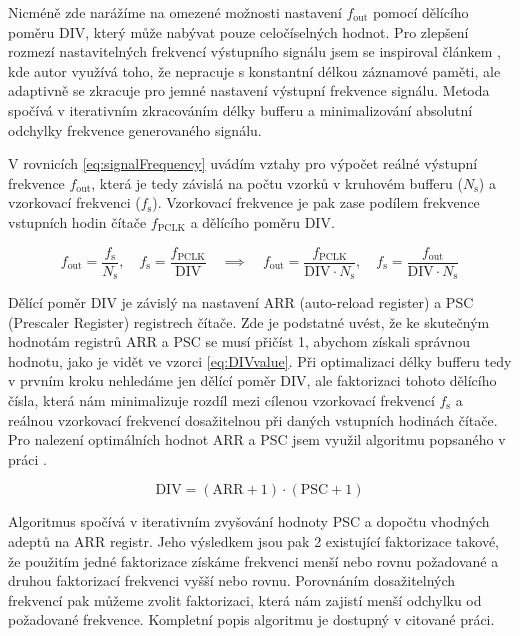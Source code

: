 Nicméně zde narážíme na omezené možnosti nastavení $f_{\text{out}}$ pomocí dělícího poměru DIV, který může nabývat pouze celočíselných hodnot. Pro zlepšení rozmezí nastavitelných frekvencí výstupního signálu jsem se inspiroval článkem \cite{SDI_Hladik}, kde autor využívá toho, že nepracuje s konstantní délkou záznamové paměti, ale adaptivně se zkracuje pro jemné nastavení výstupní frekvence signálu. Metoda spočívá v iterativním zkracováním délky bufferu a minimalizování absolutní odchylky frekvence generovaného signálu.

V rovnicích \ref{eq:signalFrequency} uvádím vztahy pro výpočet reálné výstupní frekvence $f_{\text{out}}$, která je tedy závislá na počtu vzorků v kruhovém bufferu  ($N_\text{s}$) a vzorkovací frekvenci ($f_\text{s}$). Vzorkovací frekvence je pak zase podílem frekvence vstupních hodin čítače $f_{\text{PCLK}}$ a dělícího poměru DIV.
 
\begin{equation}
	f_{\text{out}}=\frac{f_{\text{s}}}{N_\text{s}},\quad  f_{\text{s}}=\frac{f_{\text{PCLK}}}{\text{DIV}} \quad \implies \quad f_{\text{out}}=\frac{f_{\text{PCLK}}}{\text{DIV}\cdot N_\text{s}}, \quad 
	f_{\text{s}}=\frac{f_{\text{out}}}{\text{DIV}\cdot N_\text{s}}
	\label{eq:signalFrequency}
\end{equation}

 Dělící poměr DIV je závislý na nastavení ARR (auto-reload register) a PSC (Prescaler Register) registrech čítače. Zde je podstatné uvést, že ke skutečným hodnotám registrů ARR a PSC se musí přičíst 1, abychom získali správnou hodnotu, jako je vidět ve vzorci \ref{eq:DIVvalue}. Při optimalizaci délky bufferu tedy  v prvním kroku nehledáme jen dělící poměr DIV, ale faktorizaci tohoto dělícího čísla, která nám minimalizuje rozdíl mezi cílenou vzorkovací frekvencí $f_{\text{s}}$ a reálnou vzorkovací frekvencí dosažitelnou při daných vstupních hodinách čítače. Pro nalezení optimálních hodnot ARR a PSC jsem využil algoritmu popsaného v práci \cite{DujavaDIP}. 
  
  \begin{equation}
 	\text{DIV}=(\text{ARR}+1)\cdot(\text{PSC}+1)
 	\label{eq:DIVvalue}
 \end{equation}
 
 Algoritmus spočívá v iterativním zvyšování hodnoty PSC a dopočtu vhodných adeptů na ARR registr. Jeho výsledkem jsou pak 2 existující faktorizace takové, že použitím jedné faktorizace získáme frekvenci menší nebo rovnu požadované a druhou faktorizací frekvenci vyšší nebo rovnu. Porovnáním dosažitelných frekvencí pak můžeme zvolit faktorizaci, která nám zajistí menší odchylku od požadované frekvence. Kompletní popis algoritmu je dostupný v citované práci.
 
